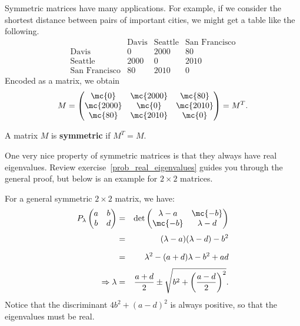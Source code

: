 
\chapter{\diagSymMatTitle}\label{symmetricmatrices}

Symmetric matrices have many applications.  For example, if we consider the shortest distance between pairs of important cities, we might get a table like the following.
\[
\begin{array}{c|ccc}
 & \text{Davis} & \text{Seattle} 
& \text{San Francisco} \\ \hline
\text{Davis} & 0 & 2000 & 80 \\
\text{Seattle} & 2000 & 0 & 2010 \\
\text{San Francisco} & 80 & 2010 & 0
\end{array}
\]
Encoded as a matrix, we obtain
\[
M=\begin{pmatrix}
\mc{0} & \mc{2000} & \mc{80} \\
\mc{2000} & \mc{0} & \mc{2010} \\
\mc{80} & \mc{2010} & \mc{0}
\end{pmatrix}=M^T.
\]

\begin{definition}
A matrix $M$ is {\bf symmetric} if  $M^T=M.$
\end{definition}

One very nice property of symmetric matrices is that they always have real eigenvalues.  Review exercise~\ref{prob_real_eigenvalues} guides you through the general proof, but below is an example for $2\times 2$ matrices.

\begin{example}
For a general symmetric $2\times 2$ matrix, we have:
\begin{eqnarray*}
P_\lambda \begin{pmatrix} a & b \\ b& d \end{pmatrix}
 &=&
\det\begin{pmatrix}\lambda-a&\mc{-b}\\\mc{-b}&\lambda-d \end{pmatrix}\\[1mm]
&=& (\lambda-a)(\lambda-d)-b^2 \\[2mm]
&=& \lambda^2-(a+d)\lambda-b^2+ad\\[1mm]
\Rightarrow \lambda &=& \frac{a+d}{2}\pm \sqrt{b^2+\left(\frac{a-d}{2}\right)^2}.
\end{eqnarray*}
Notice that the discriminant $4b^2+(a-d)^2$ is always positive, so that the eigenvalues must be real.
\end{example}

